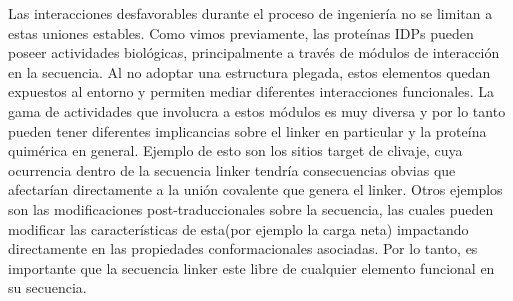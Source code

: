 Las interacciones desfavorables durante el proceso de ingeniería no se limitan a estas uniones estables.
Como vimos previamente, las proteínas IDPs pueden poseer actividades biológicas, principalmente a través de módulos de interacción en la secuencia. 
Al no adoptar una estructura plegada, estos elementos quedan expuestos al entorno y permiten mediar diferentes interacciones funcionales.
La gama de actividades que involucra a estos módulos es muy diversa y por lo tanto pueden tener diferentes implicancias sobre el linker en particular y la proteína quimérica en general.
Ejemplo de esto son los sitios target de clivaje, cuya ocurrencia dentro de la secuencia linker tendría consecuencias obvias que afectarían directamente a la unión covalente que genera el linker.
Otros ejemplos son las modificaciones post-traduccionales sobre la secuencia, las cuales pueden modificar las características de esta(por ejemplo la carga neta) impactando directamente en las propiedades conformacionales asociadas.
Por lo tanto, es importante que la secuencia linker este libre de cualquier elemento funcional en su secuencia. 





